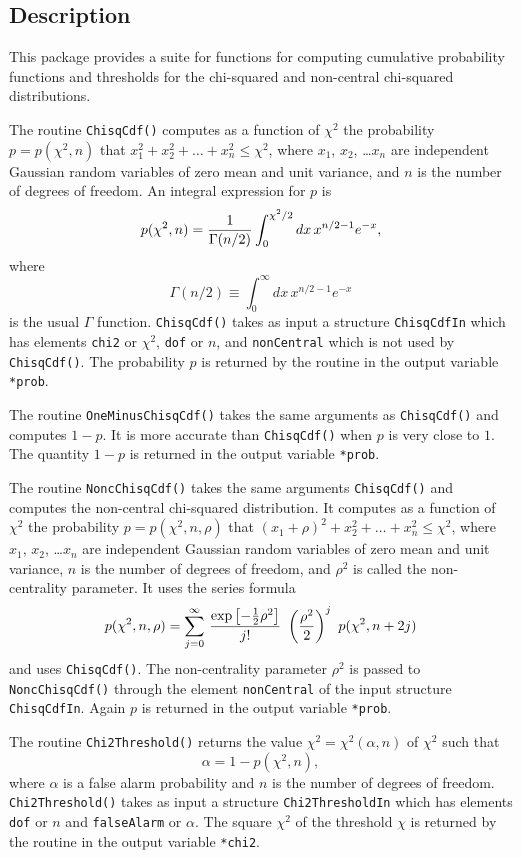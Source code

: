\documentclass{article}
\begin{document}
\subsection{Description}

This package provides a suite for functions for computing cumulative
probability functions and thresholds for the chi-squared and
non-central chi-squared distributions.

The routine \verb+ChisqCdf()+ computes as a function of $\chi^2$ the
probability $p = p(\chi^2,n)$ that $x_1^2 + x_2^2 + \ldots + x_n^2 \le \chi^2$,
where $x_1$, $x_2$, \ldots $x_n$ are independent Gaussian random
variables of zero mean and unit variance, and $n$ is the number of
degrees of freedom.  An integral expression for $p$ is
$$
p(\chi^2,n) = {1 \over \Gamma(n/2)} \int_0^{\chi^2/2} dx \, x^{n/2-1} e^{-x},
$$
where 
$$
\Gamma(n/2) \equiv \int_0^\infty dx \, x^{n/2-1} e^{-x}
$$
is the usual $\Gamma$ function.  \verb+ChisqCdf()+ takes as input a
structure \verb+ChisqCdfIn+ which has elements \verb+chi2+ or
$\chi^2$, \verb+dof+ or $n$, and \verb+nonCentral+ which is not used
by \verb+ChisqCdf()+.  The probability $p$ is returned by the routine 
in the output variable \verb+*prob+.


The routine \verb+OneMinusChisqCdf()+ takes the same arguments as
\verb+ChisqCdf()+ and computes $1-p$.  It is more accurate than
\verb+ChisqCdf()+ when $p$ is very close to $1$.  The quantity $1-p$
is returned in the output variable \verb+*prob+.


The routine \verb+NoncChisqCdf()+ takes the same arguments
\verb+ChisqCdf()+ and computes the non-central chi-squared
distribution.  It computes as a function of $\chi^2$ the
probability $p = p(\chi^2,n,\rho)$ that $(x_1+\rho)^2 + x_2^2 + \ldots
+ x_n^2 \le \chi^2$, 
where $x_1$, $x_2$, \ldots $x_n$ are independent Gaussian random
variables of zero mean and unit variance, $n$ is the number of
degrees of freedom, and $\rho^2$ is called the non-centrality
parameter.  It uses the series formula
$$
p(\chi^2,n,\rho) = \sum_{j=0}^\infty \, { \exp\left[ -{1 \over 2}
\rho^2 \right] \over j!} \ \left( {\rho^2 \over 2} \right)^j \
p(\chi^2,n+2j)
$$
and uses \verb+ChisqCdf()+.  The non-centrality parameter
$\rho^2$ is passed to \verb+NoncChisqCdf()+ through the element
\verb+nonCentral+ of the input structure \verb+ChisqCdfIn+.
Again $p$ is returned in the output variable \verb+*prob+.



The routine \verb+Chi2Threshold()+ returns the value $\chi^2 =
\chi^2(\alpha,n)$ of $\chi^2$ such that 
$$
\alpha = 1 - p(\chi^2,n),
$$
where $\alpha$ is a false alarm probability and $n$ is the number of
degrees of freedom.  \verb+Chi2Threshold()+ takes as input a
structure \verb+Chi2ThresholdIn+ which has elements \verb+dof+ or
$n$ and \verb+falseAlarm+ or $\alpha$.  The square $\chi^2$ of the
threshold $\chi$ is returned by the routine in the output variable
\verb+*chi2+. 
\end{document}
